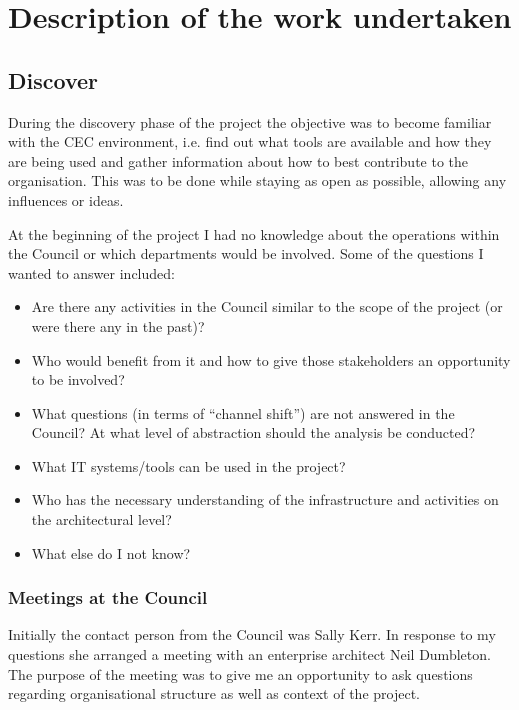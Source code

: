 
\chapter{Description of the work undertaken}

	\section{Discover}
	
During the discovery phase of the project the objective was to become familiar with the CEC environment, i.e. find out what tools are available and how they are being used and gather information about how to best contribute to the organisation. This was to be done while staying as open as possible, allowing any influences or ideas.

At the beginning of the project I had no knowledge about the operations within the Council or which departments would be involved. Some of the questions I wanted to answer included:
\begin{itemize}
\item Are there any activities in the Council similar to the scope of the project (or were there any in the past)?
\item Who would benefit from it and how to give those stakeholders an opportunity to be involved?
\item What questions (in terms of “channel shift”) are not answered in the Council?
At what level of abstraction should the analysis be conducted?
\item What IT systems/tools can be used in the project?
\item Who has the necessary understanding of the infrastructure and activities on the architectural level?
\item What else do I not know?
\end{itemize}

		\subsection{Meetings at the Council}
		
Initially the contact person from the Council was Sally Kerr. In response to my questions she arranged a meeting with an enterprise architect Neil Dumbleton. The purpose of the meeting was to give me an opportunity to ask questions regarding organisational structure as well as context of the project.

